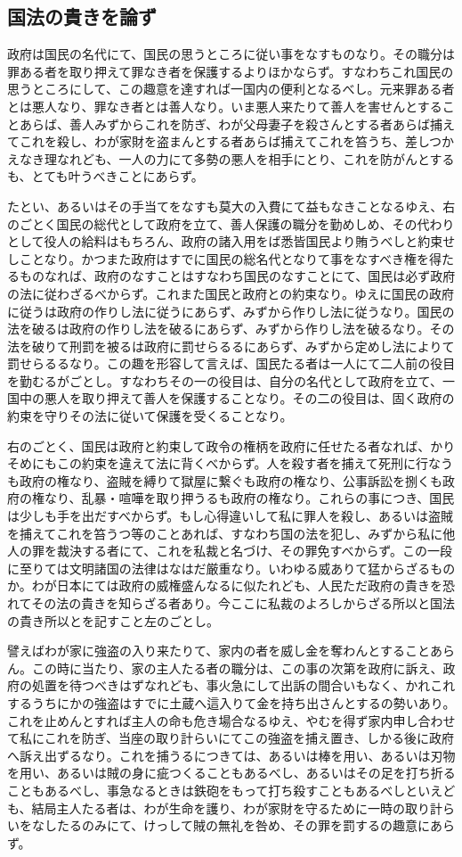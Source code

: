 \documentclass[a4paper, platex, dvipdfmx]{jsarticle}
\begin{document}
\subsection{国法の貴きを論ず}
政府は国民の名代にて、国民の思うところに従い事をなすものなり。その職分は罪ある者を取り押えて罪なき者を保護するよりほかならず。すなわちこれ国民の思うところにして、この趣意を達すれば一国内の便利となるべし。元来罪ある者とは悪人なり、罪なき者とは善人なり。いま悪人来たりて善人を害せんとすることあらば、善人みずからこれを防ぎ、わが父母妻子を殺さんとする者あらば捕えてこれを殺し、わが家財を盗まんとする者あらば捕えてこれを笞うち、差しつかえなき理なれども、一人の力にて多勢の悪人を相手にとり、これを防がんとするも、とても叶うべきことにあらず。

たとい、あるいはその手当てをなすも莫大の入費にて益もなきことなるゆえ、右のごとく国民の総代として政府を立て、善人保護の職分を勤めしめ、その代わりとして役人の給料はもちろん、政府の諸入用をば悉皆国民より賄うべしと約束せしことなり。かつまた政府はすでに国民の総名代となりて事をなすべき権を得たるものなれば、政府のなすことはすなわち国民のなすことにて、国民は必ず政府の法に従わざるべからず。これまた国民と政府との約束なり。ゆえに国民の政府に従うは政府の作りし法に従うにあらず、みずから作りし法に従うなり。国民の法を破るは政府の作りし法を破るにあらず、みずから作りし法を破るなり。その法を破りて刑罰を被るは政府に罰せらるるにあらず、みずから定めし法によりて罰せらるるなり。この趣を形容して言えば、国民たる者は一人にて二人前の役目を勤むるがごとし。すなわちその一の役目は、自分の名代として政府を立て、一国中の悪人を取り押えて善人を保護することなり。その二の役目は、固く政府の約束を守りその法に従いて保護を受くることなり。

右のごとく、国民は政府と約束して政令の権柄を政府に任せたる者なれば、かりそめにもこの約束を違えて法に背くべからず。人を殺す者を捕えて死刑に行なうも政府の権なり、盗賊を縛りて獄屋に繋ぐも政府の権なり、公事訴訟を捌くも政府の権なり、乱暴・喧嘩を取り押うるも政府の権なり。これらの事につき、国民は少しも手を出だすべからず。もし心得違いして私に罪人を殺し、あるいは盗賊を捕えてこれを笞うつ等のことあれば、すなわち国の法を犯し、みずから私に他人の罪を裁決する者にて、これを私裁と名づけ、その罪免すべからず。この一段に至りては文明諸国の法律はなはだ厳重なり。いわゆる威ありて猛からざるものか。わが日本にては政府の威権盛んなるに似たれども、人民ただ政府の貴きを恐れてその法の貴きを知らざる者あり。今ここに私裁のよろしからざる所以と国法の貴き所以とを記すこと左のごとし。

譬えばわが家に強盗の入り来たりて、家内の者を威し金を奪わんとすることあらん。この時に当たり、家の主人たる者の職分は、この事の次第を政府に訴え、政府の処置を待つべきはずなれども、事火急にして出訴の間合いもなく、かれこれするうちにかの強盗はすでに土蔵へ這入りて金を持ち出さんとするの勢いあり。これを止めんとすれば主人の命も危き場合なるゆえ、やむを得ず家内申し合わせて私にこれを防ぎ、当座の取り計らいにてこの強盗を捕え置き、しかる後に政府へ訴え出ずるなり。これを捕うるにつきては、あるいは棒を用い、あるいは刃物を用い、あるいは賊の身に疵つくることもあるべし、あるいはその足を打ち折ることもあるべし、事急なるときは鉄砲をもって打ち殺すこともあるべしといえども、結局主人たる者は、わが生命を護り、わが家財を守るために一時の取り計らいをなしたるのみにて、けっして賊の無礼を咎め、その罪を罰するの趣意にあらず。
\end{document}
